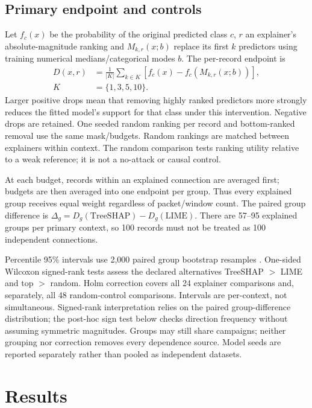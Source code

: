\documentclass[conference,letterpaper]{IEEEtran}
\begin{document}
\subsection{Primary endpoint and controls}
Let $f_c(x)$ be the probability of the original predicted class $c$, $r$ an explainer's absolute-magnitude ranking and $M_{k,r}(x;b)$ replace its first $k$ predictors using training numerical medians/categorical modes $b$. The per-record endpoint is
\begin{equation}
\begin{aligned}
D(x,r)&=\frac{1}{|K|}\sum_{k\in K}\left[f_c(x)-f_c(M_{k,r}(x;b))\right],\\
K&=\{1,3,5,10\}.
\end{aligned}
\label{eq:deletion}
\end{equation}
Larger positive drops mean that removing highly ranked predictors more strongly reduces the fitted model's support for that class under this intervention. Negative drops are retained. One seeded random ranking per record and bottom-ranked removal use the same mask/budgets. Random rankings are matched between explainers within context. The random comparison tests ranking utility relative to a weak reference; it is not a no-attack or causal control.

At each budget, records within an explained connection are averaged first; budgets are then averaged into one endpoint per group. Thus every explained group receives equal weight regardless of packet/window count. The paired group difference is $\Delta_g=D_g(\mathrm{TreeSHAP})-D_g(\mathrm{LIME})$. There are 57--95 explained groups per primary context, so 100 records must not be treated as 100 independent connections.

Percentile 95\% intervals use 2,000 paired group bootstrap resamples \cite{efron}. One-sided Wilcoxon signed-rank tests \cite{wilcoxon} assess the declared alternatives TreeSHAP $>$ LIME and top $>$ random. Holm correction \cite{holm} covers all 24 explainer comparisons and, separately, all 48 random-control comparisons. Intervals are per-context, not simultaneous. Signed-rank interpretation relies on the paired group-difference distribution; the post-hoc sign test below checks direction frequency without assuming symmetric magnitudes. Groups may still share campaigns; neither grouping nor correction removes every dependence source. Model seeds are reported separately rather than pooled as independent datasets.

\section{Results}
\end{document}
